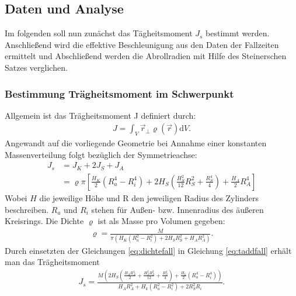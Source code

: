 \subsection{Daten und Analyse} %
Im folgenden soll nun zunächst das Tägheitsmoment $J_s$ bestimmt werden. Anschließend wird die effektive Beschleunigung aus den Daten der Fallzeiten ermittelt und Abschließend werden die Abrollradien mit Hilfe des Steinerschen Satzes verglichen. 

\subsubsection{Bestimmung Trägheitsmoment im Schwerpunkt}

Allgemein ist das Trägheitsmoment J definiert durch:
\begin{align}
J= \int_{V} \vec{r}_{\perp} \varrho (\vec{r}) \mathrm{d}V.
\end{align}
Angewandt auf die vorliegende Geometrie bei Annahme einer konstanten Massenverteilung folgt bezüglich der Symmetrieachse: 
\begin{align}
J_s&= J_{K}+2J_{S}+J_{A}\\
&=\varrho \pi \left[\frac{H_K}{2} (R_a^4-R_i^4)+  2 H_S(\frac{H_S^2}{12} R_S^2+\frac{R_S^4}{4})+  \frac{H_A}{2}R_A^4  \right] \label{eq:taddfall}
\end{align}	
Wobei $H$ die jeweilige Höhe und R den jeweiligen Radius des Zylinders beschreiben. $R_a$ und $R_i$ stehen für Außen- bzw. Innenradius des äußeren Kreisrings. Die Dichte $\varrho$ ist als Masse pro Volumen gegeben:
\begin{align}
	\varrho=\frac{M}{\pi(H_K  (R_a^2-R_i^2)+2 H_S  R_S^2+ H_A  R_A^2)}. \label{eq:dichtefall}
\end{align} 
Durch einsetzten der Gleichungen \ref{eq:dichtefall} in Gleichung \ref{eq:taddfall} erhält man das Trägheitsmoment
\begin{align}
J_s=\frac{M \left(2 H_{S} \left(\frac{H_{A} R_{A}^{4}}{2} + \frac{H_{S}^{2} R_{S}^{2}}{12} + \frac{R_{S}^{4}}{4}\right) + \frac{ H_{k}}{2} \left(R_{a}^{4} - R_{i}^{4}\right)\right)}{H_{A} R_{A}^{2} + H_{k} \left(R_{a}^{2} - R_{i}^{2}\right) + 2 R_{S}^{2} R_{i}} \label{eq:Jfall}.
\end{align}



